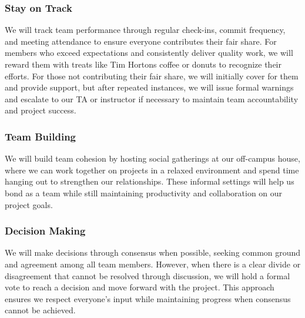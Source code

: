 \documentclass{article}
\begin{document}
\subsubsection*{Stay on Track}

We will track team performance through regular check-ins, commit frequency, and meeting attendance to ensure everyone contributes their fair share. 
For members who exceed expectations and consistently deliver quality work, we will reward them with treats like Tim Hortons coffee or donuts to recognize their efforts. 
For those not contributing their fair share, we will initially cover for them and provide support, but after repeated instances, we will issue formal warnings and escalate 
to our TA or instructor if necessary to maintain team accountability and project success.

\subsubsection*{Team Building}

We will build team cohesion by hosting social gatherings at our off-campus house, where we can work together on projects in a relaxed environment and spend time hanging out
to strengthen our relationships. These informal settings will help us bond as a team while still maintaining productivity and collaboration on our project goals.

\subsubsection*{Decision Making} 

We will make decisions through consensus when possible, seeking common ground and agreement among all team members. However, when there is a clear divide or disagreement that 
cannot be resolved through discussion, we will hold a formal vote to reach a decision and move forward with the project. This approach ensures we respect everyone's input while 
maintaining progress when consensus cannot be achieved.
\end{document}
